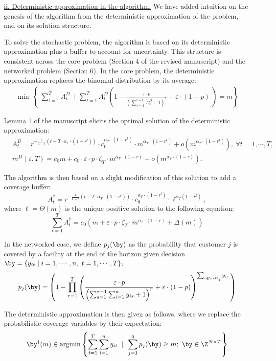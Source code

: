 \documentclass[11pt]{article}
\DeclareMathOperator*{\argmin}{argmin}
\begin{document}
\underline{ii. Deterministic approximation in the algorithm.} We have added intuition on the genesis of the algorithm from the deterministic approximation of the problem, and on its solution structure.

To solve the stochastic problem, the algorithm is based on its deterministic approximation plus a buffer to account for uncertainty. This structure is consistent across the core problem (Section 4 of the revised manuscript) and the networked problem (Section 6). In the core problem, the deterministic approximation replaces the binomial distribution by its average:
\begin{align*}
    \min\ \left\{\ \sum_{t=1}^T A^D_t \ \ \bigg|\ \ \sum_{t=1}^TA^D_t \left(1 - \frac{\varepsilon\cdot p}{\left(\sum_{s=1}^{t-1} A^D_s +1\right)^r} - \varepsilon\cdot(1-p)\ \right)=m\right\}
\end{align*}

Lemma 1 of the manuscript elicits the optimal solution of the deterministic approximation:
\begin{align*}
       & A^D_t = r^{-\frac{1}{1-r}\left(t-T\cdot\alpha_T\cdot(1-r^t)\right)}\cdot c_0^{\alpha_T\cdot(1-r^t)}\cdot m^{\alpha_T\cdot(1-r^t)}+ o\left(m^{\alpha_T\cdot(1-r^t)}\right),\ \forall t=1,\cdots,T,\\
       &m^D(\varepsilon, T) = c_0m+c_0\cdot\varepsilon\cdot p\cdot\zeta_T\cdot m^{\alpha_T\cdot(1-r)} +  o\left(m^{\alpha_T\cdot(1-r)}\right).
\end{align*}

The algorithm is then based on a slight modification of this solution to add a coverage buffer:
$$A^\dagger_t=r^{-\frac{1}{1-r}\left(t-T\cdot\alpha_T\cdot(1-r^t)\right)}\cdot c_0^{\alpha_T\cdot(1-r^t)}\cdot \ell^{\alpha_T(1-r^t)},$$
where $\ell=\Theta(m)$ is the unique positive solution to the following equation:
$$\sum_{t=1}^T A^\dagger_t= c_0 \left(m + \varepsilon\cdot p\cdot\zeta_T\cdot m^{\alpha_T\cdot(1-r)}+ \Delta(m)\right)$$

In the networked case, we define $p_{j}(\by)$ as the probability that customer $j$ is covered by a facility at the end of the horizon given decision $\by=\{y_{it}\mid i=1,\cdots,n,\ t=1,\cdots,T\}$:
$$p_{j}(\by)=\left(1-\prod_{\tau=1}^T \left(\frac{\varepsilon\cdot p}{\left(\sum_{s=1}^{\tau-1} \sum_{i=1}^n y_{is} +1\right)^r}+\varepsilon\cdot(1-p)\right)^{\sum_{i \in \calF_j} y_{i\tau}}\right)$$

The deterministic approximation is then given as follows, where we replace the probabilistic coverage variables by their expectation:
\begin{align*}
    \by^\dagger(m)\in\argmin\left\{\sum_{t=1}^T \sum_{i=1}^n y_{it}\ \mid\ \sum_{j=1}^q p_j(\by) \geq m;\ \by \in \Z^{N \times T}\right\}
\end{align*}
\end{document}
